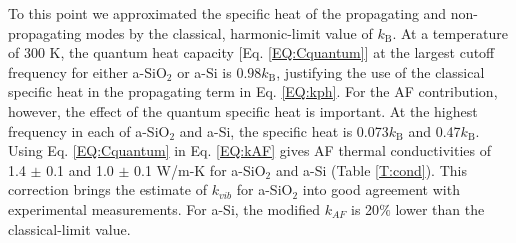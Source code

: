 \documentclass[aps,prb,twocolumn,superscriptaddress,footinbib,amsmath,amssymb,floatfix]{revtex4}
\begin{document}
To this point we approximated the specific heat 
of the propagating 
and non-propagating modes by the classical, harmonic-limit 
value of $k_{\text{B}}$. At a temperature of $300$ K, the quantum 
heat capacity [Eq. \eqref{EQ:Cquantum}] 
at the largest cutoff frequency for either a-SiO$_2$ or a-Si 
is $0.98 k_{\text{B}}$, justifying the 
use of the classical specific heat in the propagating term 
in Eq. \eqref{EQ:kph}. For the AF contribution, however, the 
effect of the quantum specific heat is important. At the highest 
frequency in each of a-SiO$_2$ and a-Si, the specific heat is 
0.073$k_{\text{B}}$ and 0.47$k_{\text{B}}$. 
Using Eq. \eqref{EQ:Cquantum} 
in Eq. \eqref{EQ:kAF} gives AF thermal conductivities of 
1.4 $\pm$ 0.1 and 
1.0 $\pm$ 0.1 W/m-K for a-SiO$_2$ and a-Si (Table \ref{T:cond}). 
This correction brings the estimate of $k_{vib}$ for 
a-SiO$_2$ into good agreement with experimental measurements.
\cite{cahill_lattice_1988,lee_heat_1997,
yamane_measurement_2002,regner_broadband_2013} 
For a-Si, the modified $k_{AF}$ is 20$\%$ lower than the 
classical-limit value. 
\end{document}
